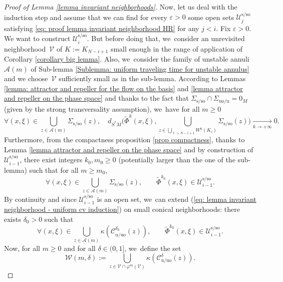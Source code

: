 \documentclass[11pt]{article}
\let\oldbigcup\bigcup
\newcommand{\rs}{\mathrm{s}}
\newcommand{\rso}{\mathrm{so}}
\newcommand{\ru}{\mathrm{u}}
\newcommand{\ruo}{\mathrm{uo}}
\theoremstyle{definition}
\theoremstyle{plain}
\newcommand{\Acal}{\mathcal{A}}
\newcommand{\Ccal}{\mathcal{C}}
\newcommand{\Ucal}{\mathcal{U}}
\newcommand{\Vcal}{\mathcal{V}}
\newcommand{\Wcal}{\mathcal{W}}
\begin{document}
\begin{proof}[Proof of Lemma \ref{lemma invariant neighborhoods}]
Now, let us deal with the induction step and assume that we can find for every $\varepsilon > 0$ some open sets $\Ucal_{j}^{\rs/\rso}$ satisfying \eqref{eq: proof lemma invariant neighborhood HR} for any $j < i$. Fix $\varepsilon > 0$. We want to construct $\Ucal_{i}^{\rs/\rso}$. But before doing that, we~consider an unrevisited neighborhood~$\Vcal$ of $K:= K_{N-i+1}$ small enough in the range of application of Corollary \ref{corollary big lemma}. Also, we~consider the family of unstable annuli $\Acal (m)$ of Sub-lemma \ref{Sublemma: uniform traveling time for unstable annulus} and we choose~$\Vcal$ sufficiently small as in the sub-lemma. According to Lemmas \ref{lemma: attractor and repeller for the flow on the basis} and \ref{lemma attractor and repeller on the phase space} and thanks to the fact that $\Sigma_{\rs/\rso}\cap \Sigma_{\ruo/\ru} = 0_M$ (given by the strong transversality assumption), we~have for all $m \geq 0$
\[
\forall (x,\xi) \in \bigcup_{z \in \Acal (m)} \Sigma_{\rs/\rso} (z), \quad d_{S^* M}\biggl(\widetilde{\Phi}^k (x,\xi), \bigcup_{z \in \oldbigcup_{\ell > N-i +1} W^\ru (K_\ell)} \Sigma_{\rs/\rso} (z) \biggr) \underset{k \to +\infty}{\to}0.
\]
Furthermore, from the compactness proposition \ref{prop compactness}, thanks to Lemma \ref{lemma attractor and repeller on the phase space} and by construction of $\Ucal_{i-1}^{\rs/\rso}$, there exist integers $k_0, m_0 \geq 0$ (potentially larger than the one of the sub-lemma) such that for all $m \geq m_0$,
\begin{equation}\label{eq: lemma invariant neighborhood - uniform cv induction}
\forall (x,\xi) \in \bigcup_{z \in \Acal (m)} \Sigma_{\rs/\rso} (z), \qquad \widetilde{\Phi}^{k_0} (x,\xi) \in \Ucal_{i-1}^{\rs/\rso}.
\end{equation}
By continuity and since $\Ucal_{i-1}^{\rs/\rso}$ is an open set, we~can extend (\ref{eq: lemma invariant neighborhood - uniform cv induction}) on small conical neighborhoods: there exists $\delta_0 > 0$ such that
\[
\forall (x,\xi) \in \bigcup_{z \in \Acal (m)} \kappa (\Ccal_{\ru/\ruo}^{\delta_0}(z)), \qquad \widetilde{\Phi}^{k_0} (x,\xi) \in \Ucal_{i-1}^{\rs/\rso}.
\]
Now, for all $m \geq 0$ and for all $\delta\in(0,1]$, we~define the set
\[
\Wcal (m,\delta):= \bigcup_{z \in \Vcal \cap \varphi^m (\Vcal)} \kappa (\Ccal_{\ru/\ruo}^{\delta}(z)).
\]


\end{proof}
\end{document}
